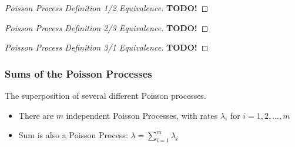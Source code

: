 \begin{proof}[Poisson Process Definition 1/2 Equivalence]\label{proof:Poisson_Process_Defn_1-2}
  \textbf{TODO!}
\end{proof}

\begin{proof}[Poisson Process Definition 2/3 Equivalence]\label{proof:Poisson_Process_Defn_2-3}
  \textbf{TODO!}
\end{proof}

\begin{proof}[Poisson Process Definition 3/1 Equivalence]\label{proof:Poisson_Process_Defn_3-1}
  \textbf{TODO!}
\end{proof}

\subsubsection{Sums of the Poisson Processes}\label{subsubsec:Sums_Poisson_Process}
The superposition of several different Poisson processes.
\begin{itemize}[noitemsep]
\item There are $m$ independent Poisson Processes, with rates $\lambda_{i}$ for $i = 1, 2, \ldots, m$
\item Sum is also a Poisson Process: $\lambda = \sum\limits_{i=1}^{m} \lambda_{i}$
\end{itemize}

